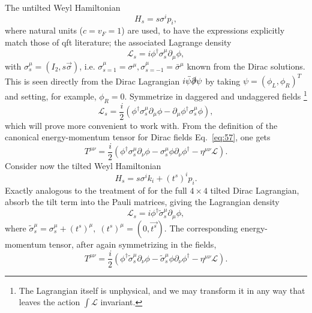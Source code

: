 The untilted Weyl Hamiltonian
\begin{equation}
  H_s = s \sigma^i p_i,
\end{equation}
where natural units (\( c = v_F = 1 \)) are used, to have the expressions explicitly match those of \gls{qft} literature;
the associated Lagrange density \cite{kachelriessQuantumFieldsHubble2018}
\begin{equation}
  \mathcal{L}_s = i \phi^{\dagger} \sigma_s^{\mu} \partial_{\mu} \phi,
\end{equation}
with \( \sigma_s^{\mu} = (I_2, s \vec{\sigma}) \), i.e. \( \sigma_{s=1}^{\mu} = \sigma^{\mu}, \sigma_{s=-1}^{\mu} = \bar{\sigma}^{\mu} \) known from the Dirac solutions.
This is seen directly from the Dirac Lagrangian \( i \bar{\psi} \slashed{\partial} \psi \) by taking \( \psi = (\phi_L, \phi_R)^T \) and setting, for example, \( \phi_R = 0 \).
Symmetrize in daggered and undaggered fields
\footnote{The Lagrangian itself is unphysical, and we may transform it in any way that leaves the action \( \int \mathcal{L} \) invariant.}
\begin{equation}
  \mathcal{L}_s = \frac{i}{2} (\phi^{\dagger} \sigma_s^{\mu} \partial_{\mu} \phi - \partial_{\mu} \phi^{\dagger} \sigma_s^{\mu} \phi),
\end{equation}
which will prove more convenient to work with.
From the definition of the canonical energy-momentum tensor for Dirac fields Eq.~\eqref{eq:57}, one gets
\begin{equation}
  T^{\mu \nu} =
  \frac{i}{2} (
  \phi^{\dagger} \sigma_s^{\mu} \partial_{\nu} \phi
  - \sigma_s^{\mu} \phi \partial_{\nu} \phi^{\dagger}
  - \eta^{\mu \nu} \mathcal{L}
  ).
\end{equation}
Consider now the tilted Weyl Hamiltonian
\begin{equation}
  H_s = s \sigma^ik_i + (t^s)^i p_i.
\end{equation}
Exactly analogous to the treatment of \textcite{vanderwurffMagnetovorticalThermoelectricTransport2019} for the full \( 4 \times 4 \) tilted Dirac Lagrangian, absorb the tilt term into the Pauli matrices, giving the Lagrangian density
\begin{equation}
  \mathcal{L}_s = i \phi^{\dagger} \tilde{\sigma}_s^{\mu} \partial_{\mu} \phi,
\end{equation}
where \( \tilde{\sigma}_s^{\mu} = \sigma_s^{\mu} + (t^s)^{\mu}, \; (t^s)^{\mu} = (0, \vec{t^s}) \).
The corresponding energy-momentum tensor, after again symmetrizing in the fields,
\begin{equation}
  T^{\mu\nu} =
  \frac{i}{2} (
  \phi^{\dagger} \tilde{\sigma}_s ^{\mu} \partial_{\nu} \phi
  - \tilde{\sigma}_s ^{\mu} \phi \partial_{\nu} \phi^{\dagger}
  - \eta^{\mu \nu} \mathcal{L}
  ).
\end{equation}
